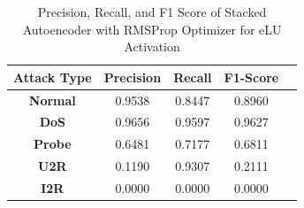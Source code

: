 \documentclass[12pt, a4paper]{report}
\begin{document}
\begin{table}[ht]
\centering
\captionsetup{justification=centering,margin=2cm}
\begin{tabular}{|c|c|c|c|c|}
\hline
\multicolumn{1}{|c|}{\textbf{Attack Type}} & \multicolumn{1}{c|}{\textbf{Precision}} & \multicolumn{1}{c|}{\textbf{Recall}} & \multicolumn{1}{c|}{\textbf{F1-Score}} \\ \hline
\textbf{Normal}        & 0.9538                                   & 0.8447                                & 0.8960                                                                  \\ \hline
\textbf{DoS}           & 0.9656                                  & 0.9597                                &  0.9627                                                                    \\ \hline
\textbf{Probe}         & 0.6481                                  & 0.7177                                & 0.6811                                                                  \\ \hline
\textbf{U2R}           & 0.1190                                    & 0.9307                                & 0.2111                                                                   \\ \hline
\textbf{I2R}           & 0.0000                                      & 0.0000                                   & 0.0000                                                            \\ \hline         \end{tabular}
\caption{Precision, Recall, and F1 Score of Stacked Autoencoder with RMSProp Optimizer for eLU Activation}
\label{prf1_rmsprop_elu_auto}
\end{table}
\clearpage
\end{document}
